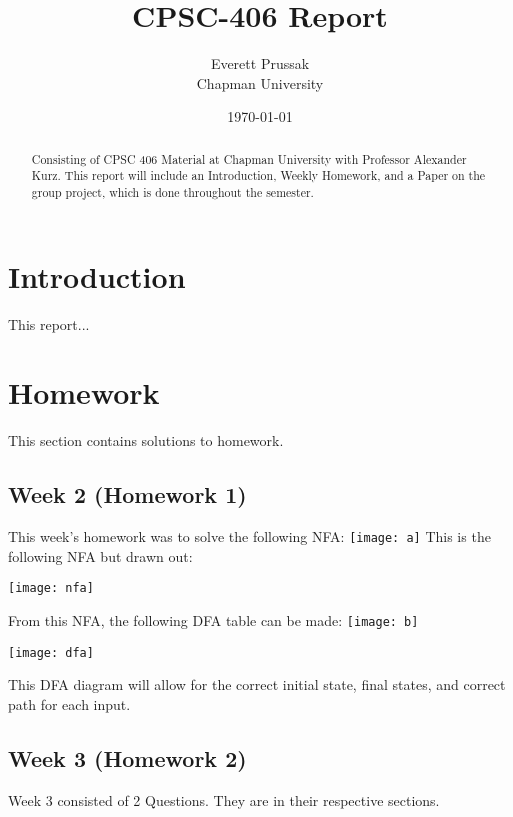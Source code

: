 \documentclass{article}
\title{CPSC-406 Report}
\author{Everett Prussak  \\ Chapman University}
\date{\today}
\theoremstyle{theorem}
\theoremstyle{definition}
\theoremstyle{remark}
\begin{document}
\maketitle

\begin{abstract}
Consisting of CPSC 406 Material at Chapman University with Professor Alexander Kurz. This report will include an Introduction, Weekly Homework, and a Paper on the group project, which is done throughout the semester. 
\end{abstract}

\tableofcontents

\section{Introduction}\label{intro}
This report...

\section{Homework}\label{homework}

This section contains solutions to homework. 

\subsection{Week 2 (Homework 1)}
This week's homework was to solve the following NFA:\noindent\newline
\texttt{[image: a]}\noindent\newline
\noindent\newline This is the following NFA but drawn out:

\texttt{[image: nfa]}\noindent\newline

From this NFA, the following DFA table can be made:\noindent\newline
\texttt{[image: b]}\noindent\newline

\texttt{[image: dfa]}\noindent\newline

\noindent\newline\newline This DFA diagram will allow for the correct initial state, final states, and correct path for each input.


\subsection{Week 3 (Homework 2)}
\noindent Week 3 consisted of 2 Questions. They are in their respective sections.\newline
\end{document}
